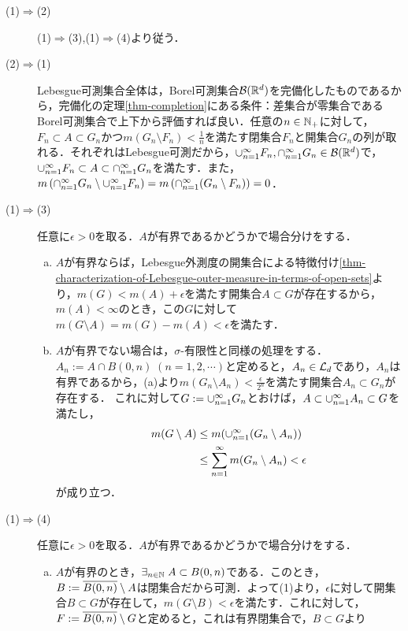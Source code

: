\documentclass[uplatex, dvipdfmx]{jsreport}
\begin{document}
\begin{Proof}\mbox{}
    \begin{description}
        \item[(1)$\Rightarrow$(2)] (1)$\Rightarrow$(3),(1)$\Rightarrow$(4)より従う．
        \item[(2)$\Rightarrow$(1)] Lebesgue可測集合全体は，Borel可測集合$\mathcal{B}(\mathbb{R}^d)$を完備化したものであるから，完備化の定理\ref{thm-completion}にある条件：差集合が零集合であるBorel可測集合で上下から評価すれば良い．任意の$n\in\mathbb{N}_+$に対して，$F_n\subset A\subset G_n$かつ$m(G_n\setminus F_n)<\frac{1}{n}$を満たす閉集合$F_n$と開集合$G_n$の列が取れる．それぞれはLebesgue可測だから，$\cup_{n=1}^\infty F_n,\cap_{n=1}^\infty G_n\in\mathcal{B}(\mathbb{R}^d)$で，
        $\cup_{n=1}^\infty F_n\subset A\subset\cap_{n=1}^\infty G_n$を満たす．また，$m\left(\cap_{n=1}^\infty G_n\setminus\cup_{n=1}^\infty F_n\right)=m\left(\cap_{n=1}^\infty(G_n\setminus F_n)\right)=0$．
        \item[(1)$\Rightarrow$(3)] 任意に$\epsilon>0$を取る．$A$が有界であるかどうかで場合分けをする．
        \begin{enumerate}[(a)]
            \item $A$が有界ならば，Lebesgue外測度の開集合による特徴付け\ref{thm-characterization-of-Lebesgue-outer-measure-in-terms-of-open-sets}より，$m(G)<m(A)+\epsilon$を満たす開集合$A\subset G$が存在するから，
            $m(A)<\infty$のとき，この$G$に対して$m(G\setminus A)=m(G)-m(A)<\epsilon$を満たす．
            \item $A$が有界でない場合は，$\sigma$-有限性と同様の処理をする．$A_n:=A\cap B(0,n)\;(n=1,2,\cdots)$と定めると，$A_n\in\mathcal{L}_d$であり，$A_n$は有界であるから，(a)より$m(G_n\setminus A_n)<\frac{\epsilon}{2^n}$を満たす開集合$A_n\subset G_n$が存在する．
            これに対して$G:=\cup_{n=1}^\infty G_n$とおけば，$A\subset\cup_{n=1}^\infty A_n\subset G$を満たし，
            \begin{align*}
                m(G\setminus A)&\le m(\cup_{n=1}^\infty(G_n\setminus A_n))\\
                &\le\sum_{n=1}^\infty m(G_n\setminus A_n)<\epsilon
            \end{align*}
            が成り立つ．
        \end{enumerate}
        \item[(1)$\Rightarrow$(4)] 任意に$\epsilon>0$を取る．$A$が有界であるかどうかで場合分けをする．
        \begin{enumerate}[(a)]
            \item $A$が有界のとき，$\exists_{n\in\mathbb{N}}\;A\subset B(0,n)$である．このとき，$B:=\overline{B(0,n)}\setminus A$は閉集合だから可測．よって(1)より，$\epsilon$に対して開集合$B\subset G$が存在して，$m(G\setminus B)<\epsilon$を満たす．これに対して，$F:=\overline{B(0,n)}\setminus G$と定めると，これは有界閉集合で，$B\subset G$より

\end{enumerate}
\end{description}
\end{Proof}
\end{document}
